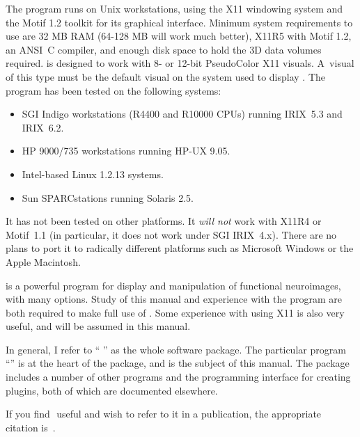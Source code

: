 The
program runs on Unix workstations, using the X11 windowing
system and the Motif 1.2 toolkit for its graphical interface.  Minimum system
requirements to use \afnit are 32 MB RAM (64-128 MB will work much better), X11R5 with
Motif 1.2, an ANSI~C compiler,
and enough disk space to hold the 3D data volumes required.
\afnit is designed to work with 8- or 12-bit PseudoColor X11 visuals.
A~visual of this type must be the default visual on the system used to display \afni.
The program has been tested on the following systems:
\begin{itemize}
   \item SGI Indigo workstations (R4400 and R10000 CPUs) running IRIX~5.3
         and IRIX~6.2.
   \item HP 9000/735 workstations running HP-UX 9.05.
   \item Intel-based Linux 1.2.13 systems.
   \item Sun SPARCstations running Solaris 2.5.
\end{itemize}
It has not been tested on other platforms.
It {\it will not\/} work with X11R4 or Motif~1.1
(in particular, it does not work under SGI IRIX~4.x).
There are no plans to port it to radically different platforms such as
Microsoft Windows or the Apple Macintosh.

\afnit is a powerful program for display and manipulation
of functional neuroimages, with many options.  Study of this
manual and experience with the program are both required to make full
use of \afni.  Some experience with using X11 is also very useful,
and will be assumed in this manual.

In general, I refer to ``\MCW$\!$ \afni'' as the whole software package.
The particular program ``\afni'' is at the heart of the package, and
is the subject of this manual.  The package includes a number of other
programs and the programming interface for
creating plugins, both of which are documented elsewhere.

If you find \MCW$\!$ \afnit useful and wish to refer to it in
a publication, the appropriate citation is~\cite{Cox-AFNI}.

